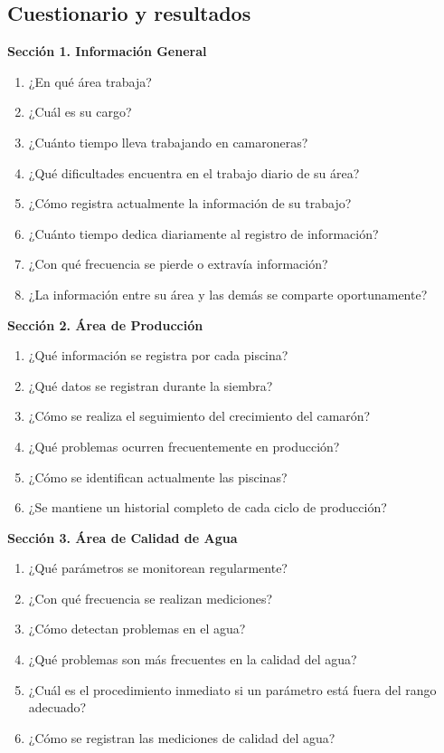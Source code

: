 \documentclass[11pt,a4paper]{article}
\begin{document}
\subsection{Cuestionario y resultados}
\noindent\textbf{Sección 1. Información General}
\begin{enumerate}
  \item ¿En qué área trabaja?
  \item ¿Cuál es su cargo?
  \item ¿Cuánto tiempo lleva trabajando en camaroneras?
  \item ¿Qué dificultades encuentra en el trabajo diario de su área?
  \item ¿Cómo registra actualmente la información de su trabajo?
  \item ¿Cuánto tiempo dedica diariamente al registro de información?
  \item ¿Con qué frecuencia se pierde o extravía información?
  \item ¿La información entre su área y las demás se comparte oportunamente?
\end{enumerate}

\noindent\textbf{Sección 2. Área de Producción}
\begin{enumerate}[resume]
  \item ¿Qué información se registra por cada piscina?
  \item ¿Qué datos se registran durante la siembra?
  \item ¿Cómo se realiza el seguimiento del crecimiento del camarón?
  \item ¿Qué problemas ocurren frecuentemente en producción?
  \item ¿Cómo se identifican actualmente las piscinas?
  \item ¿Se mantiene un historial completo de cada ciclo de producción?
\end{enumerate}

\noindent\textbf{Sección 3. Área de Calidad de Agua}
\begin{enumerate}[resume]
  \item ¿Qué parámetros se monitorean regularmente?
  \item ¿Con qué frecuencia se realizan mediciones?
  \item ¿Cómo detectan problemas en el agua?
  \item ¿Qué problemas son más frecuentes en la calidad del agua?
  \item ¿Cuál es el procedimiento inmediato si un parámetro está fuera del rango adecuado?
  \item ¿Cómo se registran las mediciones de calidad del agua?
\end{enumerate}
\end{document}
